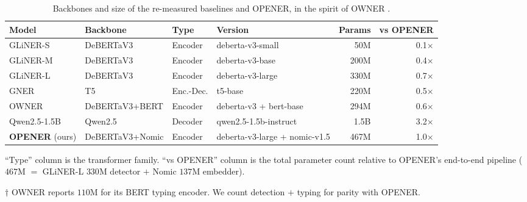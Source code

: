 \begin{table}[tp]
\centering
\caption{Backbones and size of the re-measured baselines and OPENER, in the spirit of OWNER \cite{genest2025owner}.}
\label{tab:baselines}
\footnotesize
\setlength{\tabcolsep}{4.5pt}
\begin{adjustbox}{max width=\textwidth}
\begin{threeparttable}
\begin{tabular}{@{}llllrr@{}}
\toprule
Model & Backbone & Type & Version & Params & vs OPENER \\
\midrule
GLiNER-S & DeBERTaV3 & Encoder & deberta-v3-small & 50M & 0.1$\times$ \\
GLiNER-M & DeBERTaV3 & Encoder & deberta-v3-base & 200M & 0.4$\times$ \\
GLiNER-L & DeBERTaV3 & Encoder & deberta-v3-large & 330M & 0.7$\times$ \\
GNER & T5 & Enc.-Dec. & t5-base & 220M & 0.5$\times$ \\
OWNER\tnote{$\dagger$} & DeBERTaV3+BERT & Encoder & deberta-v3 + bert-base & 294M & 0.6$\times$ \\
Qwen2.5-1.5B & Qwen2.5 & Decoder & qwen2.5-1.5b-instruct & 1.5B & 3.2$\times$ \\
\midrule
\rowcolor{hlorange} \textbf{OPENER} (ours) & DeBERTaV3+Nomic & Encoder & deberta-v3-large + nomic-v1.5 & 467M & 1.0$\times$ \\
\bottomrule
\end{tabular}
\begin{tablenotes}[flushleft]
\footnotesize
\item ``Type'' column is the transformer family. ``vs OPENER'' column is the total parameter count relative to OPENER's end-to-end pipeline ($467$M $=$ GLiNER-L $330$M detector $+$ Nomic $137$M embedder).
\item[$\dagger$] OWNER reports $110$M for its BERT typing encoder. We count detection $+$ typing for parity with OPENER.
\end{tablenotes}
\end{threeparttable}
\end{adjustbox}
\end{table}

